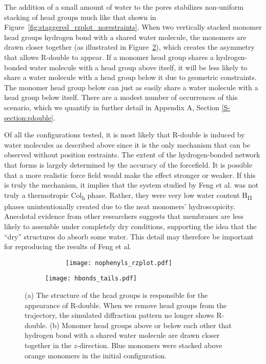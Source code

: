  \label{modification:rdouble2}
  The addition of a small amount of water to the pores stabilizes non-uniform
  stacking of head groups much like that shown in
  Figure~\ref{fig:staggered_rzplot_norestraints}. When two vertically stacked
  monomer head groups hydrogen bond with a shared water molecule, the monomers
  are drawn closer together (as illustrated in
  Figure~\ref{fig:hbond_visualization}), which creates the asymmetry that allows
  R-double to appear. If a monomer head group shares a hydrogen-bonded water
  molecule with a head group above itself, it will be less likely to share a
  water molecule with a head group below it due to geometric constraints. The
  monomer head group below can just as easily share a water molecule with a head
  group below itself. There are a modest number of occurrences of this scenario,
  which we quantify in further detail in Appendix A, Section \ref{S-section:rdouble}.  

  Of all the configurations tested, it is most likely that R-double is induced
  by water molecules as described above since it is the only mechanism that can
  be observed without position restraints. The extent of the hydrogen-bonded
  network that forms is largely determined by the accuracy of the forcefield. It
  is possible that a more realistic force field would make the effect stronger or
  weaker. If this is truly the mechanism, it implies that the system studied by
  Feng et al.\cite{feng_scalable_2014,feng_thin_2016} was not truly a
  thermotropic Col\textsubscript{h} phase. Rather, they were very low water
  content H\textsubscript{II} phases unintentionally created due to the neat
  monomers' hydroscopicity.  Anecdotal evidence from other researchers suggests
  that membranes are less likely to assemble under completely dry
  conditions, supporting the idea %
  that the ``dry'' structures do absorb some water. This detail may therefore be
  important for reproducing the results of Feng et al.

  \begin{figure}[!htb]
  \begin{subfigure}{0.45\textwidth}
  \centering
  \begin{subfigure}{\textwidth}
  \texttt{[image: nophenyls\_rzplot.pdf]}
  \end{subfigure}
  \caption{}\label{fig:rdouble_nophenyls}
  \end{subfigure}
  \begin{subfigure}{0.45\textwidth}
  \centering
  \texttt{[image: hbonds\_tails.pdf]}
  \caption{}\label{fig:hbond_visualization}
  \end{subfigure}
  \caption{(a) The structure of the head groups is responsible for the appearance of
  R-double. When we remove head groups from the trajectory, the simulated 
  diffraction pattern no longer shows R-double. (b) Monomer head groups above or below
  each other that hydrogen bond with a shared water molecule are drawn closer
  together in the $z$-direction. Blue monomers were stacked above orange monomers in the
  initial configuration.}\label{fig:hydrogen_bonds}
  \end{figure}
  
